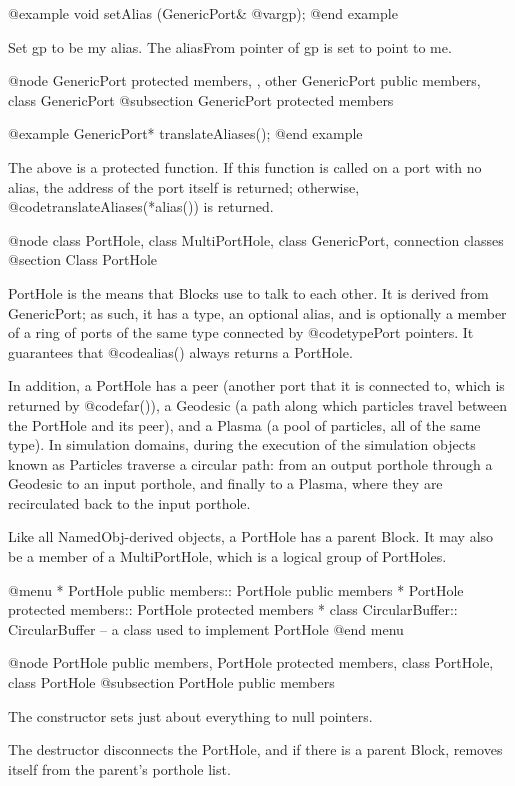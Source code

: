 @example
void setAlias (GenericPort& @var{gp});
@end example

Set gp to be my alias.  The aliasFrom pointer of gp is set to
point to me.

@node GenericPort protected members,  , other GenericPort public members, class GenericPort
@subsection GenericPort protected members

@example
GenericPort* translateAliases();
@end example

The above is a protected function.  If this function is called on
a port with no alias, the address of the port itself is returned;
otherwise, @code{translateAliases(*alias())} is returned.

@node class PortHole, class MultiPortHole, class GenericPort, connection classes
@section Class PortHole

PortHole is the means that Blocks use to talk to each other.  It is
derived from GenericPort; as such, it has a type, an optional alias,
and is optionally a member of a ring of ports of the same type connected
by @code{typePort} pointers.  It guarantees that @code{alias()} always
returns a PortHole.

In addition, a PortHole has a peer (another port that it is connected
to, which is returned by @code{far()}), a Geodesic (a path along which
particles travel between the PortHole and its peer), and a Plasma (a
pool of particles, all of the same type).  In simulation domains,
during the execution of the simulation objects known as Particles
traverse a circular path: from an output porthole through a Geodesic to
an input porthole, and finally to a Plasma, where they are recirculated
back to the input porthole.

Like all NamedObj-derived objects, a PortHole has a parent Block.  It
may also be a member of a MultiPortHole, which is a logical group of
PortHoles.

@menu
* PortHole public members::     PortHole public members
* PortHole protected members::  PortHole protected members
* class CircularBuffer::        CircularBuffer -- a class used to implement PortHole
@end menu

@node PortHole public members, PortHole protected members, class PortHole, class PortHole
@subsection PortHole public members

The constructor sets just about everything to null pointers.

The destructor disconnects the PortHole, and if there is a parent Block,
removes itself from the parent's porthole list.

